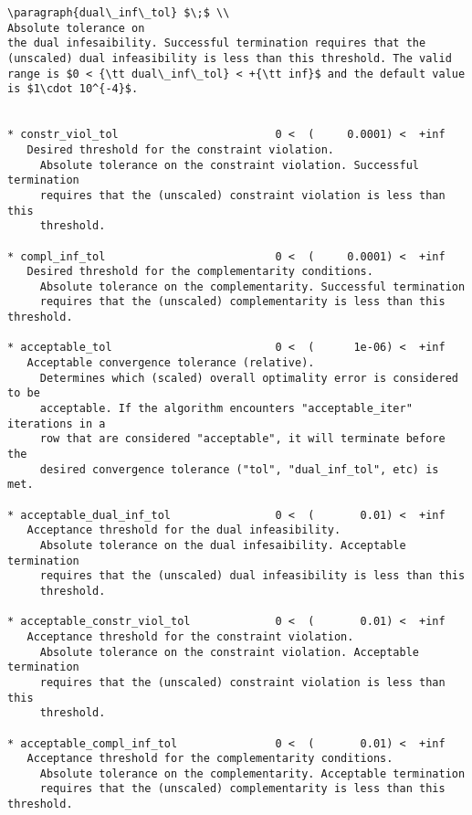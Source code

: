 \documentclass[letter,10pt]{article}
\begin{document}
{\begin{verbatim}
\paragraph{dual\_inf\_tol} $\;$ \\
Absolute tolerance on
the dual infesaibility. Successful termination requires that the
(unscaled) dual infeasibility is less than this threshold. The valid
range is $0 < {\tt dual\_inf\_tol} < +{\tt inf}$ and the default value
is $1\cdot 10^{-4}$.


* constr_viol_tol                        0 <  (     0.0001) <  +inf      
   Desired threshold for the constraint violation.
     Absolute tolerance on the constraint violation. Successful termination
     requires that the (unscaled) constraint violation is less than this
     threshold.

* compl_inf_tol                          0 <  (     0.0001) <  +inf      
   Desired threshold for the complementarity conditions.
     Absolute tolerance on the complementarity. Successful termination
     requires that the (unscaled) complementarity is less than this threshold.

* acceptable_tol                         0 <  (      1e-06) <  +inf      
   Acceptable convergence tolerance (relative).
     Determines which (scaled) overall optimality error is considered to be
     acceptable. If the algorithm encounters "acceptable_iter" iterations in a
     row that are considered "acceptable", it will terminate before the
     desired convergence tolerance ("tol", "dual_inf_tol", etc) is met.

* acceptable_dual_inf_tol                0 <  (       0.01) <  +inf      
   Acceptance threshold for the dual infeasibility.
     Absolute tolerance on the dual infesaibility. Acceptable termination
     requires that the (unscaled) dual infeasibility is less than this
     threshold.

* acceptable_constr_viol_tol             0 <  (       0.01) <  +inf      
   Acceptance threshold for the constraint violation.
     Absolute tolerance on the constraint violation. Acceptable termination
     requires that the (unscaled) constraint violation is less than this
     threshold.

* acceptable_compl_inf_tol               0 <  (       0.01) <  +inf      
   Acceptance threshold for the complementarity conditions.
     Absolute tolerance on the complementarity. Acceptable termination
     requires that the (unscaled) complementarity is less than this threshold.


\end{verbatim}}
\end{document}
